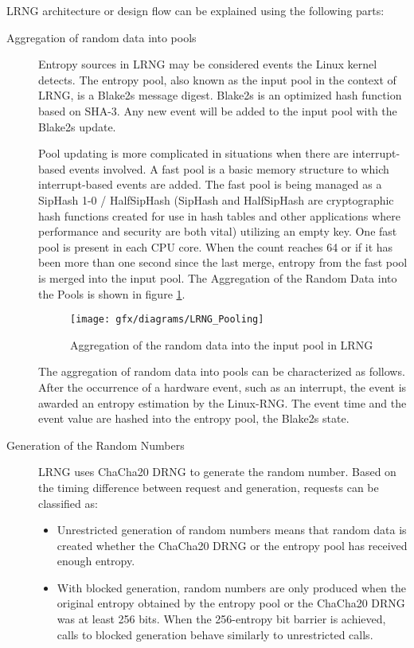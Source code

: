LRNG architecture or design flow can be explained using the following parts: 
\begin{description}
	\item[Aggregation of random data into pools] Entropy sources in LRNG may be considered events the Linux kernel detects. The entropy pool, also known as the input pool in the context of LRNG, is a Blake2s message digest. Blake2s is an optimized hash function based on SHA-3. Any new event will be added to the input pool with the Blake2s update.
	
	Pool updating is more complicated in situations when there are interrupt-based events involved. A fast pool is a basic memory structure to which interrupt-based events are added. The fast pool is being managed as a SipHash 1-0 / HalfSipHash (SipHash and HalfSipHash are cryptographic hash functions created for use in hash tables and other applications where performance and security are both vital) utilizing an empty key. One fast pool is present in each CPU core. When the count reaches 64 or if it has been more than one second since the last merge, entropy from the fast pool is merged into the input pool. The Aggregation of the Random Data into the Pools is shown in figure \ref{fig:3:16}.
	
	\begin{figure}[!h]
		\centering
		\texttt{[image: gfx/diagrams/LRNG\_Pooling]}
		\caption{Aggregation of the random data into the input pool in LRNG \cite{LRNG-2022}}
		\label{fig:3:16}
	\end{figure}
	
	The aggregation of random data into pools can be characterized as follows. After the occurrence of a hardware event, such as an interrupt, the event is awarded an entropy estimation by the Linux-RNG. The event time and the event value are hashed into the entropy pool, the Blake2s state.
	
	\item[Generation of the Random Numbers] LRNG uses ChaCha20 DRNG to generate the random number. Based on the timing difference between request and generation, requests can be classified as:
	\begin{itemize}
		\item Unrestricted generation of random numbers means that random data is created whether the ChaCha20 DRNG or the entropy pool has received enough entropy.
		\item With blocked generation, random numbers are only produced when the original entropy obtained by the entropy pool or the ChaCha20 DRNG was at least 256 bits. When the 256-entropy bit barrier is achieved, calls to blocked generation behave similarly to unrestricted calls.
	\end{itemize}
	

\end{description}
